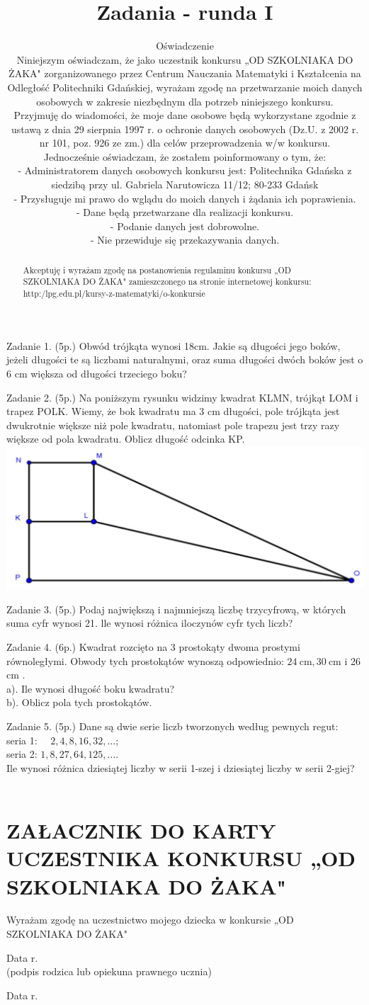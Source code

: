 \documentclass[10pt]{article}
\title{Zadania - runda I }
\author{Oświadczenie\\
Niniejszym oświadczam, że jako uczestnik konkursu „OD SZKOLNIAKA DO ŻAKA" zorganizowanego przez Centrum Nauczania Matematyki i Kształcenia na Odległość Politechniki Gdańskiej, wyrażam zgodę na przetwarzanie moich danych osobowych w zakresie niezbędnym dla potrzeb niniejszego konkursu.\\
Przyjmuję do wiadomości, że moje dane osobowe będą wykorzystane zgodnie z ustawą z dnia 29 sierpnia 1997 r. o ochronie danych osobowych (Dz.U. z 2002 r. nr 101, poz. 926 ze zm.) dla celów przeprowadzenia w/w konkursu.\\
Jednocześnie oświadczam, że zostałem poinformowany o tym, że:\\
- Administratorem danych osobowych konkursu jest: Politechnika Gdańska z siedzibą przy ul. Gabriela Narutowicza 11/12; 80-233 Gdańsk\\
- Przysługuje mi prawo do wglądu do moich danych i żądania ich poprawienia.\\
- Dane będą przetwarzane dla realizacji konkursu.\\
- Podanie danych jest dobrowolne.\\
- Nie przewiduje się przekazywania danych.}
\date{}
\begin{document}
\maketitle
Zadanie 1. (5p.) Obwód trójkąta wynosi 18cm. Jakie są długości jego boków, jeżeli długości te są liczbami naturalnymi, oraz suma długości dwóch boków jest o 6 cm większa od długości trzeciego boku?

Zadanie 2. (5p.) Na poniższym rysunku widzimy kwadrat KLMN, trójkąt LOM i trapez POLK. Wiemy, że bok kwadratu ma 3 cm długości, pole trójkąta jest dwukrotnie większe niż pole kwadratu, natomiast pole trapezu jest trzy razy większe od pola kwadratu. Oblicz długość odcinka KP.\\
\includegraphics[max width=\textwidth, center]{2024_11_21_b991f37c2e98d6141e21g-1}

Zadanie 3. (5p.) Podaj największą i najmniejszą liczbę trzycyfrową, w których suma cyfr wynosi 21. lle wynosi różnica iloczynów cyfr tych liczb?

Zadanie 4. (6p.) Kwadrat rozcięto na 3 prostokąty dwoma prostymi równoległymi. Obwody tych prostokątów wynoszą odpowiednio: \(24 \mathrm{~cm}, 30 \mathrm{~cm}\) i 26 cm .\\
a). Ile wynosi długość boku kwadratu?\\
b). Oblicz pola tych prostokątów.

Zadanie 5. (5p.) Dane są dwie serie liczb tworzonych według pewnych regut:\\
seria 1: \(\quad 2,4,8,16,32, \ldots\);\\
seria 2: \(1,8,27,64,125, \ldots\).\\
Ile wynosi różnica dziesiątej liczby w serii 1-szej i dziesiątej liczby w serii 2-giej?\\
\(\qquad\)

\section*{ZAŁACZNIK DO KARTY UCZESTNIKA KONKURSU „OD SZKOLNIAKA DO ŻAKA" }
Wyrażam zgodę na uczestnictwo mojego dziecka w konkursie „OD SZKOLNIAKA DO ŻAKA"

Data r.\\
(podpis rodzica lub opiekuna prawnego ucznia)

\begin{abstract}
Akceptuję i wyrażam zgodę na postanowienia regulaminu konkursu „OD SZKOLNIAKA DO ŻAKA" zamieszczonego na stronie internetowej konkursu: http:/lpg.edu.pl/kursy-z-matematyki/o-konkursie
\end{abstract}

Data r.
\end{document}
